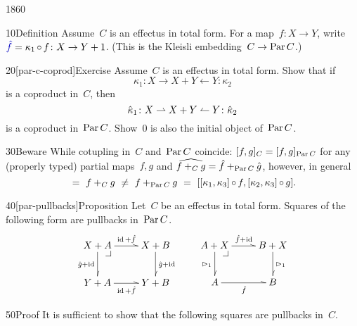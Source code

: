 \begin{parsec}{1860}%
\begin{point}{10}{Definition}%
Assume~$C$ is an effectus in total form.
For a map~$f\colon X \to Y$,
    write~$\Define{\hat{f}} = \kappa_1 \after f \colon X \to Y+1$.
    (This is the Kleisli embedding~$C \to \operatorname{Par} C$.)
\end{point}
\begin{point}{20}[par-c-coprod]{Exercise}%
Assume~$C$ is an effectus in total form.
Show that if
\begin{equation*}
\kappa_1 \colon X \to X+Y \leftarrow Y \colon \kappa_2
\end{equation*}
    is a coproduct in~$C$, then~
\begin{equation*}
    \hat\kappa_1 \colon X \rightharpoonup X+Y \leftharpoonup Y \colon \hat\kappa_2
\end{equation*}
    is a coproduct in~$\operatorname{Par} C$.
Show~$0$ is also the initial object of~$\operatorname{Par} C$.
\begin{point}{30}{Beware}%
While cotupling in~$C$ and~$\operatorname{Par} C$ coincide:
$[f,g]_{C} = [f,g]_{\operatorname{Par} C}$
for any (properly typed) partial maps~$f,g$
and $\widehat{f+_C g} = \hat{f} +_{\operatorname{Par} C} \hat{g}$,
    however, in general
    \begin{equation*}
    [\kappa_1 \after f, \kappa_2 \after g] \ =\  f+_C g \ \neq\  f +_{\Par C} g
        \ =\  [[\kappa_1,\kappa_3] \after f,
            [\kappa_2, \kappa_3] \after g].
    \end{equation*}
\end{point}
\end{point}
\begin{point}{40}[par-pullbacks]{Proposition}%
Let~$C$ be an effectus in total form.
Squares of the following form are pullbacks in~$\operatorname{Par} C$.
\begin{equation*}
    \xymatrix{
        X+A \pullback \ar@^{>}[r]^{\id+\hat{f}} \ar@^{>}[d]_{\hat{g} + \id}
        & X+B \ar@^{>}[d]^{\hat{g}+\id}
        \\ Y+A \ar@^{>}[r]_{\id+\hat{f}}
        & Y+B
    } \qquad
    \xymatrix{
        A+X \pullback \ar@^{>}[r]^{\hat{f}+\id} \ar@^{>}[d]_{\pproj_1}
        & B+X \ar@^{>}[d]^{\pproj_1}
        \\ A \ar@^{>}[r]_{\hat{f}}
        & B
    }
\end{equation*}
\begin{point}{50}{Proof}%
It is sufficient to show that the following squares
are pullbacks in~$C$.
\begin{equation*}

\end{equation*}
\end{point}
\end{point}
\end{parsec}
